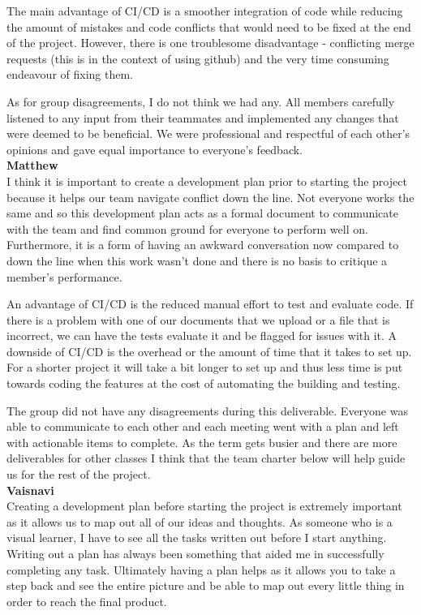 \documentclass{article}
\begin{document}
The main advantage of CI/CD is a smoother integration of code while reducing the amount of mistakes and code conflicts that would need to be fixed at the end of the project. However, there is one troublesome disadvantage - conflicting merge requests (this is in the context of using github) and the very time consuming endeavour of fixing them. 

As for group disagreements, I do not think we had any. All members carefully listened to any input from their teammates and implemented any changes that were deemed to be beneficial. We were professional and respectful of each other’s opinions and gave equal importance to everyone’s feedback. \\


\textbf{Matthew}\\
I think it is important to create a development plan prior to starting the project because it helps our team navigate conflict down the line. Not everyone works the same and so this development plan acts as a formal document to communicate with the team and find common ground for everyone to perform well on. Furthermore, it is a form of having an awkward conversation now compared to down the line when this work wasn't done and there is no basis to critique a member's performance. 

An advantage of CI/CD is the reduced manual effort to test and evaluate code. If there is a problem with one of our documents that we upload or a file that is incorrect, we can have the tests evaluate it and be flagged for issues with it. A downside of CI/CD is the overhead or the amount of time that it takes to set up. For a shorter project it will take a bit longer to set up and thus less time is put towards coding the features at the cost of automating the building and testing.

The group did not have any disagreements during this deliverable. Everyone was able to communicate to each other and each meeting went with a plan and left with actionable items to complete. As the term gets busier and there are more deliverables for other classes I think that the team charter below will help guide us for the rest of the project. \\

\noindent \textbf{Vaisnavi} \\
Creating a development plan before starting the project is extremely important as it allows us to map out all of our ideas and thoughts. As someone who is a visual learner, I have to see all the tasks written out before I start anything. Writing out a plan has always been something that aided me in successfully completing any task. Ultimately having a plan helps as it allows you to take a step back and see the entire picture and be able to map out every little thing in order to reach the final product.
\end{document}
